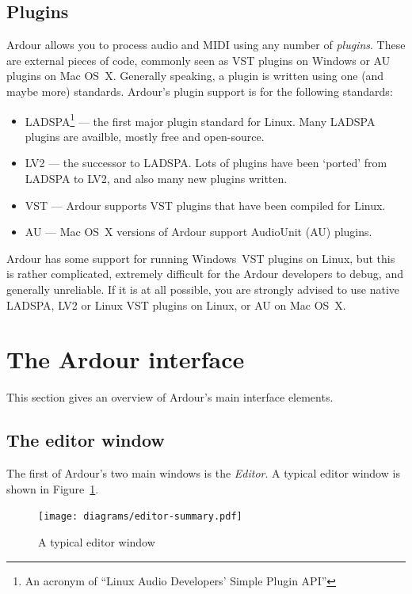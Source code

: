 \documentclass[10pt,a4paper]{book}
\begin{document}
\subsection{Plugins}

Ardour allows you to process audio and MIDI using any number of
\emph{plugins}.  These are external pieces of code, commonly seen as
VST plugins on Windows or AU plugins on Mac OS~X.  Generally speaking,
a plugin is written using one (and maybe more) standards.  Ardour's
plugin support is for the following standards:

\begin{itemize}
\item LADSPA\footnote{An acronym of ``Linux Audio Developers' Simple
  Plugin API''} --- the first major plugin standard for Linux.  Many
  LADSPA plugins are availble, mostly free and open-source. 
\item LV2 --- the successor to LADSPA.  Lots of plugins have been
  `ported' from LADSPA to LV2, and also many new plugins written. 
\item VST --- Ardour supports VST plugins that have been compiled for Linux. 
\item AU --- Mac OS~X versions of Ardour support AudioUnit (AU) plugins. 
\end{itemize}

Ardour has some support for running Windows~VST plugins on Linux, but
this is rather complicated, extremely difficult for the Ardour
developers to debug, and generally unreliable.  If it is at all
possible, you are strongly advised to use native LADSPA, LV2 or Linux
VST plugins on Linux, or AU on Mac OS~X\@.


\section{The Ardour interface}

This section gives an overview of Ardour's main interface elements.

\subsection{The editor window}

The first of Ardour's two main windows is the \emph{Editor}.  A
typical editor window is shown in Figure~\ref{fig:typical-editor}.

\begin{figure}[ht]
\begin{center}
\texttt{[image: diagrams/editor-summary.pdf]}
\end{center}
\caption{A typical editor window}
\label{fig:typical-editor}
\end{figure}
\end{document}
